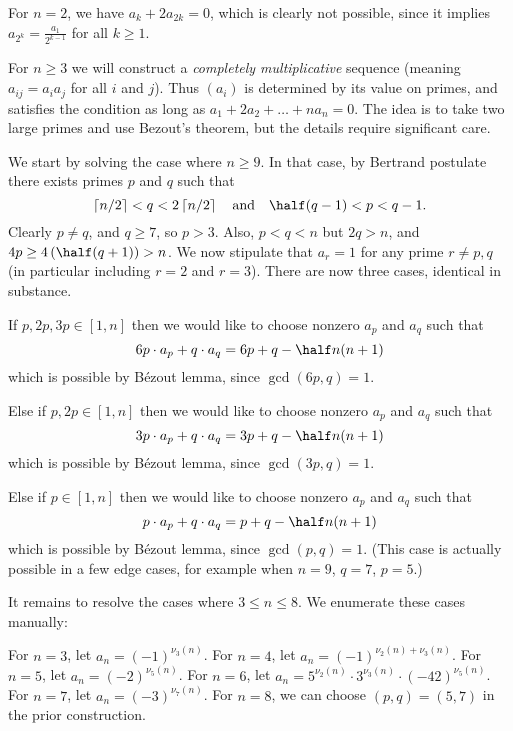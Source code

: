 \documentclass[11pt]{scrartcl}
\begin{document}
For $n = 2$, we have $a_k + 2a_{2k} = 0$,
which is clearly not possible,
since it implies $a_{2^k} = \frac{a_1}{2^{k-1}}$
for all $k \ge 1$.

For $n \ge 3$ we will construct a \emph{completely multiplicative} sequence
(meaning $a_{ij} = a_i a_j$ for all $i$ and $j$).
Thus $(a_i)$ is determined by its value on primes,
and satisfies the condition as long as
$a_1 + 2a_2 + \dots + na_n = 0$.
The idea is to take two large primes and use Bezout's theorem,
but the details require significant care.

We start by solving the case where $n \ge 9$.
In that case, by Bertrand postulate there exists primes $p$ and $q$ such that
\[
  \left\lceil n/2 \right\rceil < q < 2\left\lceil n/2 \right\rceil
  \quad\text{and}\quad
  \half(q-1) < p < q-1.
\]
Clearly $p \neq q$, and $q \ge 7$, so $p > 3$.
Also, $p < q < n$ but $2q > n$, and $4p \ge 4\left( \half(q+1) \right) > n$.
We now stipulate that $a_r = 1$ for any prime $r \neq p,q$
(in particular including $r=2$ and $r=3$).
There are now three cases, identical in substance.
\begin{itemize}
  \ii If $p, 2p, 3p \in [1,n]$ then we would like to
  choose nonzero $a_p$ and $a_q$ such that
  \[ 6p \cdot a_p + q \cdot a_q = 6p + q - \half n (n+1) \]
  which is possible by B\'{e}zout lemma, since $\gcd(6p,q) = 1$.

  \ii Else if $p, 2p \in [1,n]$ then we would like to
  choose nonzero $a_p$ and $a_q$ such that
  \[ 3p \cdot a_p + q \cdot a_q = 3p + q - \half n (n+1) \]
  which is possible by B\'{e}zout lemma, since $\gcd(3p, q) = 1$.

  \ii Else if $p \in [1,n]$ then we would like to
  choose nonzero $a_p$ and $a_q$ such that
  \[ p \cdot a_p + q \cdot a_q = p + q - \half n (n+1) \]
  which is possible by B\'{e}zout lemma, since $\gcd(p, q) = 1$.
  (This case is actually possible in a few edge cases,
  for example when $n=9$, $q=7$, $p=5$.)
\end{itemize}

It remains to resolve the cases where $3 \le n \le 8$.
We enumerate these cases manually:
\begin{itemize}
  \ii For $n = 3$, let $a_n = (-1)^{\nu_3(n)}$.
  \ii For $n = 4$, let $a_n = (-1)^{\nu_2(n) + \nu_3(n)}$.
  \ii For $n = 5$, let $a_n = (-2)^{\nu_5(n)}$.
  \ii For $n = 6$, let $a_n =  5^{\nu_2(n)} \cdot 3^{\nu_3(n)} \cdot (-42)^{\nu_5(n)}$.
  \ii For $n = 7$, let $a_n = (-3)^{\nu_7(n)}$.
  \ii For $n = 8$, we can choose $(p,q) = (5,7)$ in the prior construction.
\end{itemize}
\end{document}
